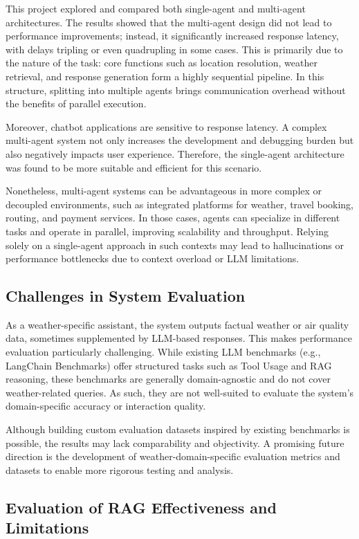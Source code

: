 \documentclass[final-report]{report-template}
\begin{document}
This project explored and compared both single-agent and multi-agent architectures. The results showed that the multi-agent design did not lead to performance improvements; instead, it significantly increased response latency, with delays tripling or even quadrupling in some cases. This is primarily due to the nature of the task: core functions such as location resolution, weather retrieval, and response generation form a highly sequential pipeline. In this structure, splitting into multiple agents brings communication overhead without the benefits of parallel execution.

Moreover, chatbot applications are sensitive to response latency. A complex multi-agent system not only increases the development and debugging burden but also negatively impacts user experience. Therefore, the single-agent architecture was found to be more suitable and efficient for this scenario.

Nonetheless, multi-agent systems can be advantageous in more complex or decoupled environments, such as integrated platforms for weather, travel booking, routing, and payment services. In those cases, agents can specialize in different tasks and operate in parallel, improving scalability and throughput. Relying solely on a single-agent approach in such contexts may lead to hallucinations or performance bottlenecks due to context overload or LLM limitations.

\subsection{Challenges in System Evaluation}

As a weather-specific assistant, the system outputs factual weather or air quality data, sometimes supplemented by LLM-based responses. This makes performance evaluation particularly challenging. While existing LLM benchmarks (e.g., LangChain Benchmarks) offer structured tasks such as Tool Usage and RAG reasoning, these benchmarks are generally domain-agnostic and do not cover weather-related queries. As such, they are not well-suited to evaluate the system’s domain-specific accuracy or interaction quality.

Although building custom evaluation datasets inspired by existing benchmarks is possible, the results may lack comparability and objectivity. A promising future direction is the development of weather-domain-specific evaluation metrics and datasets to enable more rigorous testing and analysis.

\subsection{Evaluation of RAG Effectiveness and Limitations}
\end{document}
